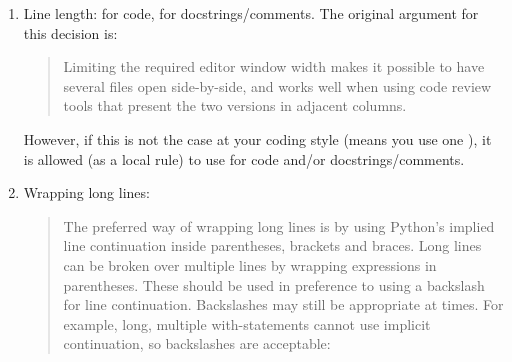 \documentclass[letterpaper,10pt,english]{sphinxmanual}
\begin{document}
\begin{enumerate}
\begin{sphinxVerbatim}[commandchars=\\\{\}]
  
      
      
\end{sphinxVerbatim}

\item {} 
Line length:  for code,  for docstrings/comments. The original argument for this decision is:
\begin{quote}

Limiting the required editor window width makes it possible to have several files open side-by-side, and works well when using code review tools that present the two versions in adjacent columns.
\end{quote}

However, if this is not the case at your coding style (means you use one ), it is allowed (as a local rule) to use  for code and/or docstrings/comments.

\item {} 
Wrapping long lines:
\begin{quote}

The preferred way of wrapping long lines is by using Python’s implied line continuation inside parentheses, brackets and braces. Long lines can be broken over multiple lines by wrapping expressions in parentheses. These should be used in preference to using a backslash for line continuation.
Backslashes may still be appropriate at times. For example, long, multiple with-statements cannot use implicit continuation, so backslashes are acceptable:
\end{quote}

\begin{sphinxVerbatim}[commandchars=\\\{\}]
    \PYGZbs{}
        
\end{sphinxVerbatim}


\end{enumerate}
\end{document}
